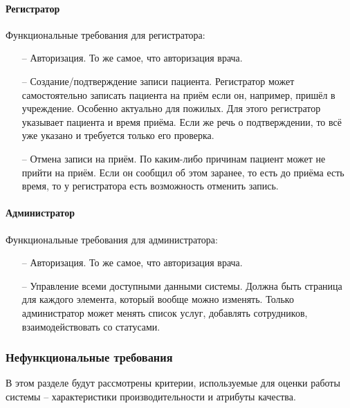 \documentclass[a4paper,article]{article}
\begin{document}
\begin{sloppypar}
    \newpage

    \paragraph{Регистратор}\label{ТЗ. Регистратор}

    Функциональные требования для регистратора:

    \begin{itemize}[nolistsep]
        \item[--] Авторизация. То же самое, что авторизация врача.
        \item[--] Создание/подтверждение записи пациента. Регистратор может самостоятельно записать пациента на приём если он, например, пришёл в учреждение. Особенно актуально для пожилых. Для этого регистратор указывает пациента и время приёма. Если же речь о подтверждении, то всё уже указано и требуется только его проверка.
        \item[--] Отмена записи на приём. По каким-либо причинам пациент может не прийти на приём. Если он сообщил об этом заранее, то есть до приёма есть время, то у регистратора есть возможность отменить запись.
    \end{itemize}

    \paragraph{Администратор}\label{ТЗ. Администратор}

    Функциональные требования для администратора:

    \begin{itemize}[nolistsep]
        \item[--] Авторизация. То же самое, что авторизация врача.
        \item[--] Управление всеми доступными данными системы. Должна быть страница для каждого элемента, который вообще можно изменять. Только администратор может менять список услуг, добавлять сотрудников, взаимодействовать со статусами.
    \end{itemize}

    \subsubsection{Нефункциональные требования}

    В этом разделе будут рассмотрены критерии, используемые для оценки работы системы -- характеристики производительности и атрибуты качества.


\end{sloppypar}
\end{document}
